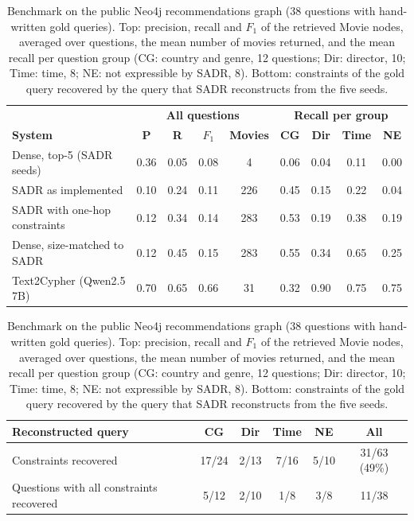 \begin{table}[htbp]
\centering
\caption{Benchmark on the public Neo4j recommendations graph (38 questions with hand-written gold queries). Top: precision, recall and $F_1$ of the retrieved Movie nodes, averaged over questions, the mean number of movies returned, and the mean recall per question group (CG: country and genre, 12 questions; Dir: director, 10; Time: time, 8; NE: not expressible by SADR, 8). Bottom: constraints of the gold query recovered by the query that SADR reconstructs from the five seeds.}
\label{tab:sadr_benchmark}
\footnotesize
\setlength{\tabcolsep}{4pt}
\begin{tabular}{lcccc|cccc}
\toprule
 & \multicolumn{4}{c|}{\textbf{All questions}} & \multicolumn{4}{c}{\textbf{Recall per group}} \\
\textbf{System} & \textbf{P} & \textbf{R} & \textbf{$F_1$} & \textbf{Movies} & \textbf{CG} & \textbf{Dir} & \textbf{Time} & \textbf{NE} \\
\midrule
Dense, top-5 (SADR seeds) & 0.36 & 0.05 & 0.08 & 4 & 0.06 & 0.04 & 0.11 & 0.00 \\
SADR as implemented & 0.10 & 0.24 & 0.11 & 226 & 0.45 & 0.15 & 0.22 & 0.04 \\
SADR with one-hop constraints & 0.12 & 0.34 & 0.14 & 283 & 0.53 & 0.19 & 0.38 & 0.19 \\
\midrule
Dense, size-matched to SADR & 0.12 & 0.45 & 0.15 & 283 & 0.55 & 0.34 & 0.65 & 0.25 \\
Text2Cypher (Qwen2.5 7B) & 0.70 & 0.65 & 0.66 & 31 & 0.32 & 0.90 & 0.75 & 0.75 \\
\bottomrule
\end{tabular}

\vspace{0.8em}
\begin{tabular}{lcccc|c}
\toprule
\textbf{Reconstructed query} & \textbf{CG} & \textbf{Dir} & \textbf{Time} & \textbf{NE} & \textbf{All} \\
\midrule
Constraints recovered & 17/24 & 2/13 & 7/16 & 5/10 & 31/63 (49\%) \\
Questions with all constraints recovered & 5/12 & 2/10 & 1/8 & 3/8 & 11/38 \\
\bottomrule
\end{tabular}
\end{table}
